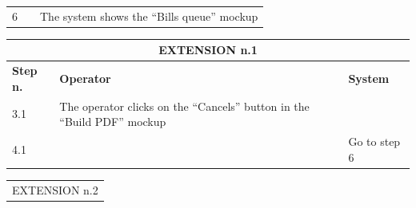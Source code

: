{{{\begin{table}[h]
\begin{tabular}{|p{2cm}|p{6cm}|p{6cm}|}
				\vspace{1mm} \vspace{1mm} \\
			\hline
				\vspace{1mm} 6 \vspace{1mm} &
				\vspace{1mm} \vspace{1mm} & 
				\vspace{1mm} The system shows the “Bills queue” mockup\vspace{1mm} \\
			\hline
			\end{tabular}
			\end{table}
			
			\begin{table}[h]
			\begin{tabular}{|p{2cm}|p{6cm}|p{6cm}|}
			\hline
				\multicolumn{3}{|c|}{EXTENSION n.1}\\
			\hline
				\centering \vspace{1mm} \bfseries{Step n.} \vspace{1mm} & \vspace{1mm} \bfseries{Operator} \vspace{1mm} & \vspace{1mm} \bfseries{System} \vspace{1mm}\\
			\hline
				\vspace{1mm} 3.1 \vspace{1mm} &
				\vspace{1mm} The operator clicks on the “Cancels” button in the “Build PDF” mockup \vspace{1mm} & 
				\vspace{1mm} \vspace{1mm} \\
			\hline
				\vspace{1mm} 4.1 \vspace{1mm} &
				\vspace{1mm} \vspace{1mm} & 
				\vspace{1mm} Go to step 6\vspace{1mm} \\
			\hline
			\end{tabular}
			\end{table}
			\begin{table}[h]
			\begin{tabular}{|p{2cm}|p{6cm}|p{6cm}|}
			\hline
				\multicolumn{3}{|c|}{EXTENSION n.2}\\

\end{tabular}
\end{table}}}}
